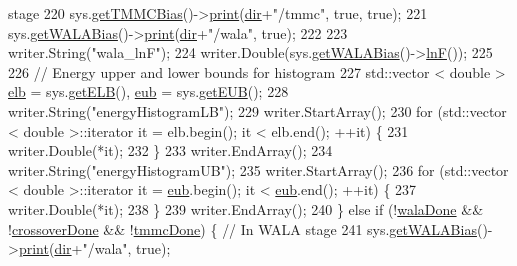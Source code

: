 \begin{DoxyCode}
{       stage}
220         sys.\hyperlink{classsim_system_aa31d40c91cb50f143a9613d362798887}{getTMMCBias}()->\hyperlink{classtmmc_ad49e147dc88b3e1c2975269598f94327}{print}(\hyperlink{classcheckpoint_a0e0f999ee8e0b09541e9131baa8a591d}{dir}+\textcolor{stringliteral}{"/tmmc"}, \textcolor{keyword}{true}, \textcolor{keyword}{true});
221         sys.\hyperlink{classsim_system_a7cb5049de8b0988349e89e30e4000407}{getWALABias}()->\hyperlink{classwala_a65569289fac85d0da9c336e17c9d809a}{print}(\hyperlink{classcheckpoint_a0e0f999ee8e0b09541e9131baa8a591d}{dir}+\textcolor{stringliteral}{"/wala"}, \textcolor{keyword}{true});
222 
223         writer.String(\textcolor{stringliteral}{"wala\_lnF"});
224         writer.Double(sys.\hyperlink{classsim_system_a7cb5049de8b0988349e89e30e4000407}{getWALABias}()->\hyperlink{classwala_acb8e59580d97bc3c5b9b4ff45eb6bb9a}{lnF}());
225 
226         \textcolor{comment}{// Energy upper and lower bounds for histogram}
227         std::vector < double > \hyperlink{classcheckpoint_a2338cb624f19eb6776c10f9bb83b2a5d}{elb} = sys.\hyperlink{classsim_system_a610cbb1c6059151e420dbd42dd9da714}{getELB}(), \hyperlink{classcheckpoint_a7071b01d0936873321d0a706e761b6ac}{eub} = sys.\hyperlink{classsim_system_ae87e0ac03cc11259cd3b44c780a90a06}{getEUB}();
228         writer.String(\textcolor{stringliteral}{"energyHistogramLB"});
229         writer.StartArray();
230         \textcolor{keywordflow}{for} (std::vector < double >::iterator it = elb.begin(); it < elb.end(); ++it) \{
231             writer.Double(*it);
232         \}
233         writer.EndArray();
234         writer.String(\textcolor{stringliteral}{"energyHistogramUB"});
235         writer.StartArray();
236         \textcolor{keywordflow}{for} (std::vector < double >::iterator it = \hyperlink{classcheckpoint_a7071b01d0936873321d0a706e761b6ac}{eub}.begin(); it < \hyperlink{classcheckpoint_a7071b01d0936873321d0a706e761b6ac}{eub}.end(); ++it) \{
237             writer.Double(*it);
238         \}
239         writer.EndArray();
240     \} \textcolor{keywordflow}{else} \textcolor{keywordflow}{if} (!\hyperlink{classcheckpoint_aab066479e2ca6656d0031dd46a2fc1a5}{walaDone} && !\hyperlink{classcheckpoint_a4f13612ea6d376bb327295bfce3a70c5}{crossoverDone} && !\hyperlink{classcheckpoint_acbe0c62aa82735741a9f396827966823}{tmmcDone}) \{ \textcolor{comment}{// In WALA stage}
241         sys.\hyperlink{classsim_system_a7cb5049de8b0988349e89e30e4000407}{getWALABias}()->\hyperlink{classwala_a65569289fac85d0da9c336e17c9d809a}{print}(\hyperlink{classcheckpoint_a0e0f999ee8e0b09541e9131baa8a591d}{dir}+\textcolor{stringliteral}{"/wala"}, \textcolor{keyword}{true});

\end{DoxyCode}
